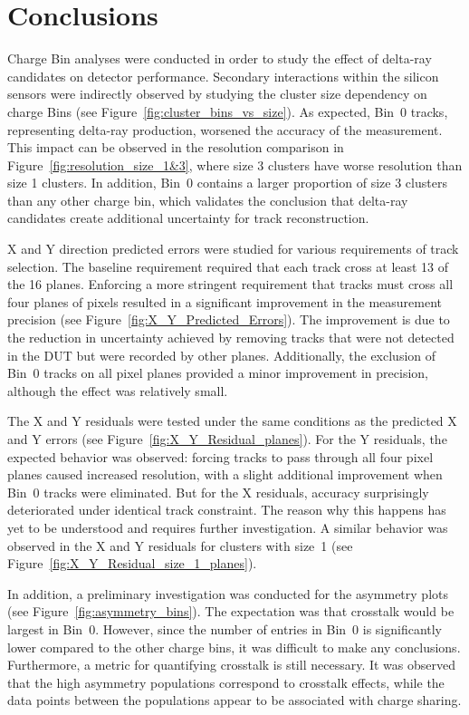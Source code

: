 



\chapter{Conclusions}

Charge Bin analyses were conducted in order to study the effect of delta-ray candidates on detector performance. Secondary interactions within the silicon sensors were indirectly observed by studying the cluster size dependency on charge Bins (see Figure~\ref{fig:cluster_bins_vs_size}). As expected, Bin~0 tracks, representing delta-ray production, worsened the accuracy of the measurement. This impact can be observed in the resolution comparison in Figure~\ref{fig:resolution_size_1&3}, where size 3 clusters have worse resolution than size 1 clusters. In addition, Bin~0 contains a larger proportion of size 3 clusters than any other charge bin, which validates the conclusion that delta-ray candidates create additional uncertainty for track reconstruction.

X and Y direction predicted errors were studied for various requirements of track selection. The baseline requirement required that each track cross at least 13 of the 16 planes. Enforcing a more stringent requirement that tracks must cross all four planes of pixels resulted in a significant improvement in the measurement precision (see Figure~\ref{fig:X_Y_Predicted_Errors}). The improvement is due to the reduction in uncertainty achieved by removing tracks that were not detected in the DUT but were recorded by other planes. Additionally, the exclusion of Bin~0 tracks on all pixel planes provided a minor improvement in precision, although the effect was relatively small.

The X and Y residuals were tested under the same conditions as the predicted X and Y errors (see Figure~\ref{fig:X_Y_Residual_planes}). For the Y residuals, the expected behavior was observed: forcing tracks to pass through all four pixel planes caused increased resolution, with a slight additional improvement when Bin~0 tracks were eliminated. But for the X residuals, accuracy surprisingly deteriorated under identical track constraint. The reason why this happens has yet to be understood and requires further investigation. A similar behavior was observed in the X and Y residuals for clusters with size~1 (see Figure~\ref{fig:X_Y_Residual_size_1_planes}).

In addition, a preliminary investigation was conducted for the asymmetry plots (see Figure~\ref{fig:asymmetry_bins}). The expectation was that crosstalk would be largest in Bin~0. However, since the number of entries in Bin~0 is significantly lower compared to the other charge bins, it was difficult to make any conclusions. Furthermore, a metric for quantifying crosstalk is still necessary. It was observed that the high asymmetry populations correspond to crosstalk effects, while the data points between the populations appear to be associated with charge sharing.

